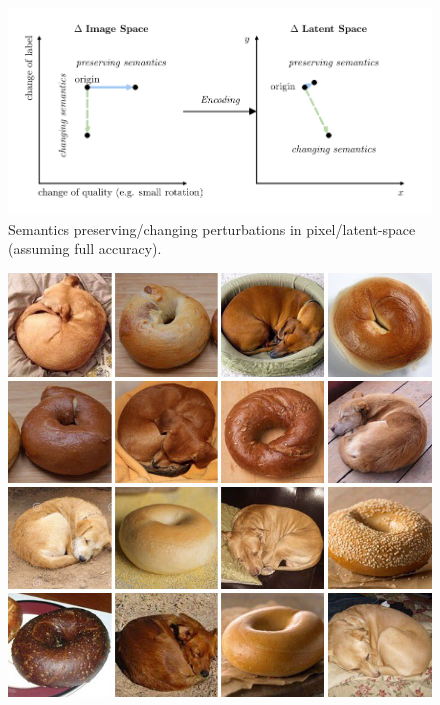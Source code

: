 \documentclass[a4paper, oneside]{discothesis}
\begin{document}
\begin{figure}
	\centering
	\includegraphics[width=0.75\columnwidth]{figures/latentspace.pdf}
	\caption{Semantics preserving/changing perturbations in pixel/latent-space (assuming full accuracy).}
	\label{fig:latentspace}
\end{figure}

\begin{figure}[th]
	\centering
	\begin{minipage}[t]{0.24\textwidth}\centering\includegraphics[width=\textwidth]{figures/dog-vs-bagel.jpeg}\end{minipage}
	\hfill

\end{figure}
\end{document}
